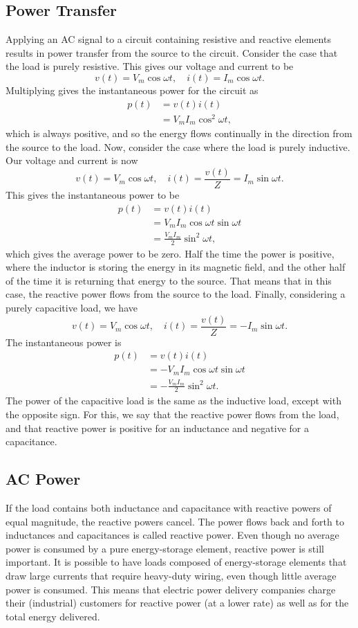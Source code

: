 \documentclass{article}
\begin{document}
\subsection{Power Transfer}
Applying an AC signal to a circuit containing resistive and reactive elements results in power transfer from the source to the circuit. Consider the case that the load is purely resistive. This gives our voltage and current to be 
\[
    v(t)=V_m\cos\omega t,\quad i(t)=I_m\cos\omega t.
\]
Multiplying gives the instantaneous power for the circuit as 
\begin{align*}
    p(t)&=v(t)i(t)\\
        &=V_mI_m \cos^2\omega t,
\end{align*}
which is always positive, and so the energy flows continually in the direction from the source to the load. Now, consider the case where the load is purely inductive. Our voltage and current is now 
\[
    v(t)=V_m\cos\omega t,\quad i(t)=\frac{v(t)}{Z}=I_m\sin\omega t.
\]
This gives the instantaneous power to be 
\begin{align*}
    p(t)&=v(t)i(t)\\
        &=V_mI_m\cos\omega t\sin\omega t\\
        &=\frac{V_mI_m}{2}\sin^2\omega t,
\end{align*}
which gives the average power to be zero. Half the time the power is positive, where the inductor is storing the energy in its magnetic field, and the other half of the time it is returning that energy to the source. That means that in this case, the reactive power flows from the source to the load. Finally, considering a purely capacitive load, we have 
\[
    v(t)=V_m\cos\omega t,\quad i(t)=\frac{v(t)}{Z}=-I_m\sin\omega t.
\]
The instantaneous power is
\begin{align*}
    p(t) &= v(t)i(t)\\
         &=-V_mI_m\cos\omega t\sin\omega t\\
         &=-\frac{V_mI_m}{2}\sin^2\omega t.
\end{align*}
The power of the capacitive load is the same as the inductive load, except with the opposite sign. For this, we say that the reactive power flows from the load, and that reactive power is positive for an inductance and negative for a capacitance.

\subsection{AC Power}
If the load contains both inductance and capacitance with reactive powers of equal magnitude, the reactive powers cancel. The power flows back and forth to inductances and capacitances is called reactive power. Even though no average power is consumed by a pure energy-storage element, reactive power is still important. It is possible to have loads composed of energy-storage elements that draw large currents that require heavy-duty wiring, even though little average power is consumed. This means that electric power delivery companies charge their (industrial) customers for reactive power (at a lower rate) as well as for the total energy delivered.
\end{document}
